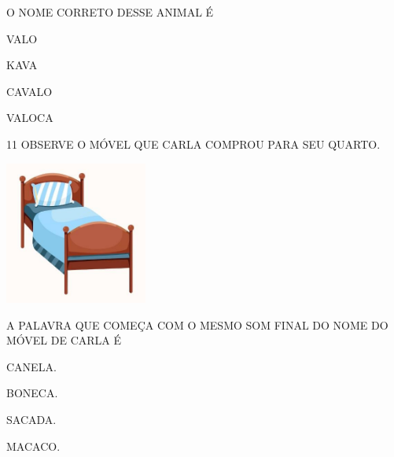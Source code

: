
O NOME CORRETO DESSE ANIMAL É

\begin{escolha}
\item VALO

\item KAVA

\item CAVALO

\item VALOCA
\end{escolha}


\num{11} OBSERVE O MÓVEL QUE CARLA COMPROU PARA SEU QUARTO.

\includegraphics[width=1.84783in,height=1.84783in]{media/image235.jpg}


A PALAVRA QUE COMEÇA COM O MESMO SOM FINAL DO NOME DO MÓVEL DE CARLA É 

\begin{escolha}
\item CANELA.

\item BONECA.

\item SACADA.

\item MACACO.
\end{escolha}

